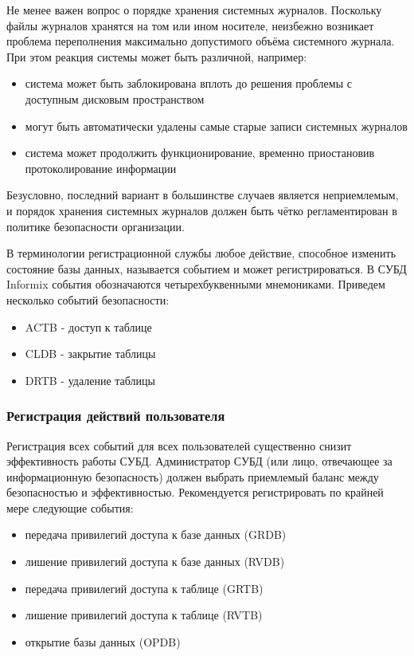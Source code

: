 Не менее важен вопрос о порядке хранения системных журналов. Поскольку файлы журналов хранятся на том или ином носителе, неизбежно возникает проблема переполнения максимально допустимого объёма системного журнала. При этом реакция системы может быть различной, например:
\begin{itemize}
    \item система может быть заблокирована вплоть до решения проблемы с доступным дисковым пространством
    \item могут быть автоматически удалены самые старые записи системных журналов
    \item система может продолжить функционирование, временно приостановив протоколирование информации
\end{itemize}

Безусловно, последний вариант в большинстве случаев является неприемлемым, и порядок хранения системных журналов должен быть чётко регламентирован в политике безопасности организации.

В терминологии регистрационной службы любое действие, способное изменить состояние базы данных, называется событием и может регистрироваться. В СУБД Informix события обозначаются четырехбуквенными мнемониками. Приведем несколько событий безопасности:
\begin{itemize}
    \item ACTB - доступ к таблице
    \item CLDB - закрытие таблицы
    \item DRTB - удаление таблицы
\end{itemize}


\subsubsection{Регистрация действий пользователя}
Регистрация всех событий для всех пользователей существенно снизит эффективность работы СУБД. Администратор СУБД (или лицо, отвечающее за информационную безопасность) должен выбрать приемлемый баланс между безопасностью и эффективностью.
Рекомендуется регистрировать по крайней мере следующие события:
\begin{itemize}
    \item передача привилегий доступа к базе данных (GRDB)
    \item лишение привилегий доступа к базе данных (RVDB)
    \item передача привилегий доступа к таблице (GRTB)
    \item лишение привилегий доступа к таблице (RVTB)
    \item открытие базы данных (OPDB)
\end{itemize}

